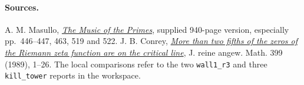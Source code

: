 \documentclass[11pt]{article}
\begin{document}
\paragraph{Sources.}
A. M. Masullo, \href{https://math216.wordpress.com/wp-content/uploads/2026/11/the-music-of-the-primes.pdf}
{\emph{The Music of the Primes}}, supplied 940-page version,
especially pp.~446--447, 463, 519 and 522.
J. B. Conrey, \href{https://doi.org/10.1515/crll.1989.399.1}
{\emph{More than two fifths of the zeros of the Riemann zeta function are
on the critical line}}, J. reine angew. Math. 399 (1989), 1--26.
The local comparisons refer to the two \texttt{wall1\_r3} and three
\texttt{kill\_tower} reports in the workspace.
\end{document}

